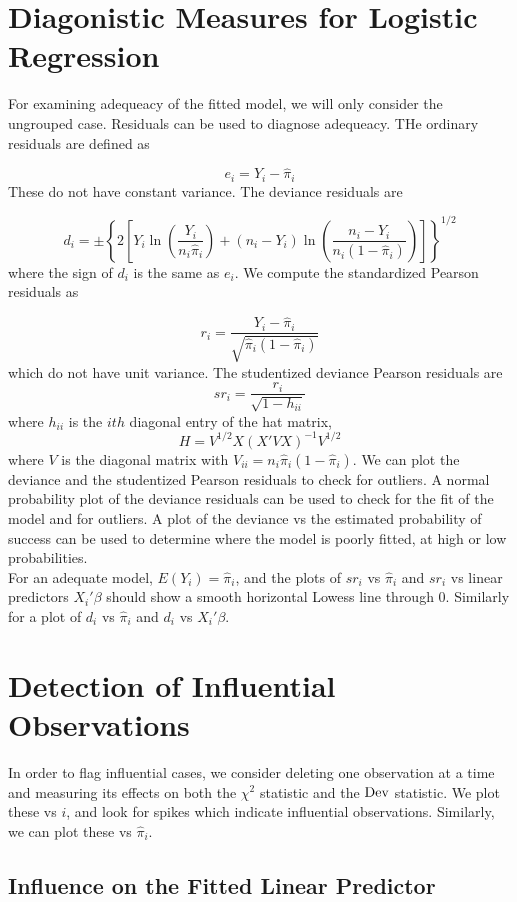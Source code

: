 \section{Diagonistic Measures for Logistic Regression}

For examining adequeacy of the fitted model, we will only consider the ungrouped case. Residuals can be used to diagnose adequeacy. THe ordinary residuals are defined as

\[e_i = Y_i - \hat{\pi}_i\]
These do not have constant variance. The deviance residuals are 

\[d_i = \pm \left\{2\left[Y_i \ln\left(\frac{Y_i}{n_i\hat{\pi}_i}\right) + (n_i-Y_i)\ln\left(\frac{n_i-Y_i}{n_i(1-\hat{\pi}_i)}\right)\right]\right\}^{1/2}\]
where the sign of $d_i$ is the same as $e_i$. We compute the standardized Pearson residuals as

\[r_i = \frac{Y_i - \hat{\pi}_i}{\sqrt{\hat{\pi}_i (1- \hat{\pi}_i)}}\]
which do not have unit variance. The studentized deviance Pearson residuals are
\[sr_i = \frac{r_i}{\sqrt{1-h_{ii}}}\]
where $h_{ii}$ is the $ith$ diagonal entry of the hat matrix, 
\[H = V^{1/2}X(X'VX)^{-1}V^{1/2}\]
where $V$ is the diagonal matrix with $V_{ii} = n_i\hat{\pi}_i(1-\hat{\pi}_i)$. We can plot the deviance and the studentized Pearson residuals to check for outliers. A normal probability plot of the deviance residuals can be used to check for the fit of the model and for outliers. A plot of the deviance vs the estimated probability of success can be used to determine where the model is poorly fitted, at high or low probabilities.\\

For an adequate model, $E(Y_i) = \hat{\pi}_i$, and the plots of $sr_i$ vs $\hat{\pi}_i$ and $sr_i$ vs linear predictors $X_i'\beta$ should show a smooth horizontal Lowess line through 0. Similarly for a plot of $d_i$ vs $\hat{\pi}_i$ and $d_i$ vs $X_i'\beta$.

\section{Detection of Influential Observations}

In order to flag influential cases, we consider deleting one observation at a time and measuring its effects on both the $\chi^2$ statistic and the $\operatorname{Dev}$ statistic. We plot these vs $i$, and look for spikes which indicate influential observations. Similarly, we can plot these vs $\hat{\pi}_i$.

\subsection{Influence on the Fitted Linear Predictor}

